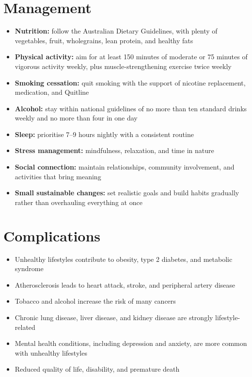 \section*{Management}
\begin{itemize}
    \item \textbf{Nutrition:} follow the Australian Dietary Guidelines, with plenty of vegetables, fruit, wholegrains, lean protein, and healthy fats
    \item \textbf{Physical activity:} aim for at least 150 minutes of moderate or 75 minutes of vigorous activity weekly, plus muscle-strengthening exercise twice weekly
    \item \textbf{Smoking cessation:} quit smoking with the support of nicotine replacement, medication, and Quitline
    \item \textbf{Alcohol:} stay within national guidelines of no more than ten standard drinks weekly and no more than four in one day
    \item \textbf{Sleep:} prioritise 7--9 hours nightly with a consistent routine
    \item \textbf{Stress management:} mindfulness, relaxation, and time in nature
    \item \textbf{Social connection:} maintain relationships, community involvement, and activities that bring meaning
    \item \textbf{Small sustainable changes:} set realistic goals and build habits gradually rather than overhauling everything at once
\end{itemize}

\section*{Complications}
\begin{itemize}
    \item Unhealthy lifestyles contribute to obesity, type 2 diabetes, and metabolic syndrome
    \item Atherosclerosis leads to heart attack, stroke, and peripheral artery disease
    \item Tobacco and alcohol increase the risk of many cancers
    \item Chronic lung disease, liver disease, and kidney disease are strongly lifestyle-related
    \item Mental health conditions, including depression and anxiety, are more common with unhealthy lifestyles
    \item Reduced quality of life, disability, and premature death
\end{itemize}

